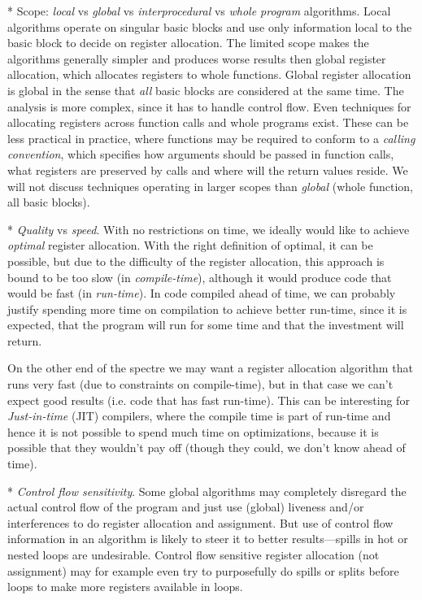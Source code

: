 \begitems
* Scope: {\em local} vs {\em global} vs {\em interprocedural} vs {\em whole
program} algorithms. Local algorithms operate on singular basic blocks and use
only information local to the basic block to decide on register allocation. The
limited scope makes the algorithms generally simpler and produces worse results
then global register allocation, which allocates registers to whole functions.
Global register allocation is global in the sense that {\em all} basic blocks
are considered at the same time. The analysis is more complex, since it has to
handle control flow. Even techniques for allocating registers across function
calls and whole programs exist. These can be less practical in practice, where
functions may be required to conform to a {\em calling convention}, which
specifies how arguments should be passed in function calls, what registers are
preserved by calls and where will the return values reside. We will not discuss
techniques operating in larger scopes than {\em global} (whole function, all
basic blocks).

* {\em Quality} vs {\em speed}. With no restrictions on time, we ideally would
like to achieve {\em optimal} register allocation. With the right definition of
optimal, it can be possible, but due to the difficulty of the register
allocation, this approach is bound to be too slow (in {\em compile-time}),
although it would produce code that would be fast (in {\em run-time}). In code
compiled ahead of time, we can probably justify spending more time on
compilation to achieve better run-time, since it is expected, that the program
will run for some time and that the investment will return.

On the other end of the spectre we may want a register allocation algorithm that
runs very fast (due to constraints on compile-time), but in that case we can't
expect good results (i.e. code that has fast run-time). This can be interesting
for {\em Just-in-time} (JIT) compilers, where the compile time is part of
run-time and hence it is not possible to spend much time on optimizations,
because it is possible that they wouldn't pay off (though they could, we don't
know ahead of time).

* {\em Control flow sensitivity}. Some global algorithms may completely
disregard the actual control flow of the program and just use (global) liveness
and/or interferences to do register allocation and assignment. But use of
control flow information in an algorithm is likely to steer it to better
results---spills in hot or nested loops are undesirable. Control flow sensitive
register allocation (not assignment) may for example even try to purposefully do
spills or splits before loops to make more registers available in loops.
\enditems

